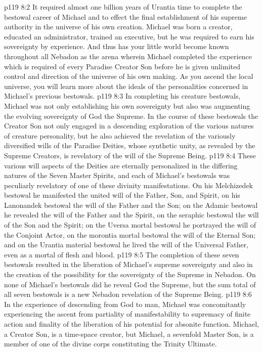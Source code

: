 \pc \vs p119 8:2 It required almost one billion years of Urantia time to complete the bestowal career of Michael and to effect the final establishment of his supreme authority in the universe of his own creation. Michael was born a creator, educated an administrator, trained an executive, but he was required to earn his sovereignty by experience. And thus has your little world become known throughout all Nebadon as the arena wherein Michael completed the experience which is required of every Paradise Creator Son before he is given unlimited control and direction of the universe of his own making. As you ascend the local universe, you will learn more about the ideals of the personalities concerned in Michael’s previous bestowals.
\pc \vs p119 8:3 In completing his creature bestowals, Michael was not only establishing his own sovereignty but also was augmenting the evolving sovereignty of God the Supreme. In the course of these bestowals the Creator Son not only engaged in a descending exploration of the various natures of creature personality, but he also achieved the revelation of the variously diversified wills of the Paradise Deities, whose synthetic unity, as revealed by the Supreme Creators, is revelatory of the will of the Supreme Being.
\vs p119 8:4 These various will aspects of the Deities are eternally personalized in the differing natures of the Seven Master Spirits, and each of Michael’s bestowals was peculiarly revelatory of one of these divinity manifestations. On his Melchizedek bestowal he manifested the united will of the Father, Son, and Spirit, on his Lanonandek bestowal the will of the Father and the Son; on the Adamic bestowal he revealed the will of the Father and the Spirit, on the seraphic bestowal the will of the Son and the Spirit; on the Uversa mortal bestowal he portrayed the will of the Conjoint Actor, on the morontia mortal bestowal the will of the Eternal Son; and on the Urantia material bestowal he lived the will of the Universal Father, even as a mortal of flesh and blood.
\vs p119 8:5 The completion of these seven bestowals resulted in the liberation of Michael’s supreme sovereignty and also in the creation of the possibility for the sovereignty of the Supreme in Nebadon. On none of Michael’s bestowals did he reveal God the Supreme, but the sum total of all seven bestowals is a new Nebadon revelation of the Supreme Being.
\vs p119 8:6 In the experience of descending from God to man, Michael was concomitantly experiencing the ascent from partiality of manifestability to supremacy of finite action and finality of the liberation of his potential for absonite function. Michael, a Creator Son, is a time\hyp{}space creator, but Michael, a sevenfold Master Son, is a member of one of the divine corps constituting the Trinity Ultimate.
